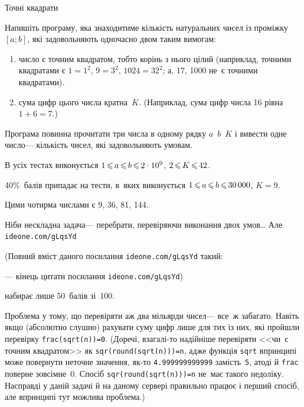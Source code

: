 \documentclass[14pt,a4paper]{extarticle}
\def\dib#1{\,#1\discretionary{}{\mbox{$#1$}}{}\,}
\renewcommand{\baselinestretch}{1.3125}
\begin{document}
\begin{problemAllDefault}{Точні квадрати}

Напишіть програму, яка знаходитиме кількість натуральних чисел із проміжку $[a; b]$, які задовольняють одночасно двом таким вимогам:
\begin{enumerate}
\item
число є точним квадратом, тобто корінь з нього цілий (наприклад, точними квадратами є ${1{=}1^2}$, ${9{=}3^2}$, ${1024{=}32^2}$; а, 17, 1000 не~є точними квадратами).
\item
сума цифр цього числа кратна~$K$. (Наприклад, сума цифр числа 16 рівна ${1{+}6{=}7}$.)
\end{enumerate}
Програма повинна прочитати три числа в одному рядку $a$~$b$~$K$ і вивести одне число\nolinebreak[3] --- кількість чисел, які задовольняють умовам.

\Scoring	В усіх тестах виконується $1\dib{{\<}}a\dib{{\<}}b\dib{{\<}}2\cdot10^9$, $2\dib{{\<}}K\dib{{\<}}42$. 

40\%~балів припадає на тести, в~яких виконується $1\dib{{\<}}a\dib{{\<}}b\dib{{\<}}30\,000$, ${K{=}9}$.


\Example
\begin{exampleSimple}{5em}{3em}%
%
\end{exampleSimple}

\Note	Цими чотирма числами є 9, 36, 81, 144. 

\end{problemAllDefault}
	

\Tutorial	Ніби нескладна задача\nolinebreak[3] --- перебрати, перевіряючи виконання двох умов\dots{} 
Але 
\verb"ideone.com/gLqsYd"


{\color{green}\begin{small}

\renewcommand{\baselinestretch}{0.875}

(Повний вміст даного посилання \verb"ideone.com/gLqsYd" такий:

--- кінець цитати посилання \verb"ideone.com/gLqsYd")

\end{small}}


 набирає лише 50~балів зі~100.

Проблема у тому, що перевіряти аж два мільярди чисел\nolinebreak[3] --- все~ж забагато. Навіть якщо (абсолютно слушно) рахувати суму цифр лише для тих із них, які пройшли перевірку \verb"frac(sqrt(n))=0". (До\nolinebreak[3] речі, взагалі-то надійніше перевіряти <<чи~є точним квадратом>> як \verb"sqr(round(sqrt(n)))=n", адже функція \verb"sqrt" в\nolinebreak[3] принципі може повернути неточне значення, як-то \verb"4.999999999999" замість~\verb"5", а\nolinebreak[3] тоді й \verb"frac" поверне зовсім\nolinebreak[3] не~0. Спосіб \verb"sqr(round(sqrt(n)))=n" не~має такого  недоліку. Насправді у даній задачі й на даному сервері правильно працює і перший спосіб, але в\nolinebreak[3] принципі тут можлива проблема.)
\end{document}
